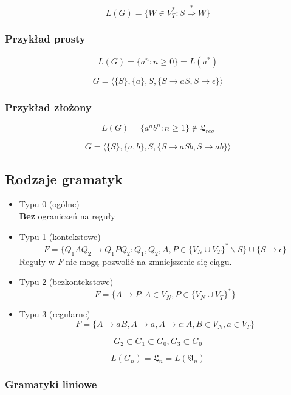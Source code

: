 \documentclass{../notatki}
\begin{document}
$$
L(G) = \{W \in V_T^* : S \stackrel{*}{\Rightarrow} W\}
$$

\subsubsection{Przykład prosty}

$$
L(G) = \{a^n : n \ge 0\} = L(a^*)
$$

$$
G = \langle \{S\}, \{a\}, S, \{S \rightarrow aS, S \rightarrow \epsilon\} \rangle
$$

\subsubsection{Przykład złożony}

$$
L(G) = \{a^nb^n : n \ge 1\} \notin \mathfrak{L}_{reg}
$$

$$
G = \langle \{S\}, \{a, b\}, S, \{S \rightarrow aSb, S \rightarrow ab\} \rangle
$$

\subsection{Rodzaje gramatyk}

\begin{itemize}
    \item Typu 0 (ogólne) \\
    \textbf{Bez} ograniczeń na reguły
    \item Typu 1 (kontekstowe) \\
    $$
    F = \{Q_1AQ_2 \rightarrow Q_1PQ_2 : Q_1, Q_2, A, P \in \{V_N \cup V_T\}^* \backslash S\} \cup \{S \rightarrow \epsilon\}
    $$
    Reguły w $F$ nie mogą pozwolić na zmniejszenie się ciągu.
    \item Typu 2 (bezkontekstowe) \\
    $$
    F = \{A \rightarrow P : A \in V_N, P \in \{V_N \cup V_T\}^*\}
    $$
    \item Typu 3 (regularne) \\
    $$
    F = \{A \rightarrow aB, A \rightarrow a, A \rightarrow \epsilon : A, B \in V_N, a \in V_T\}
    $$
\end{itemize}

$$
G_2 \subset G_1 \subset G_0, G_3 \subset G_0
$$

$$
L(G_n) = \mathfrak{L}_n = L(\mathfrak{A}_n)
$$

\subsubsection{Gramatyki liniowe}
\end{document}
